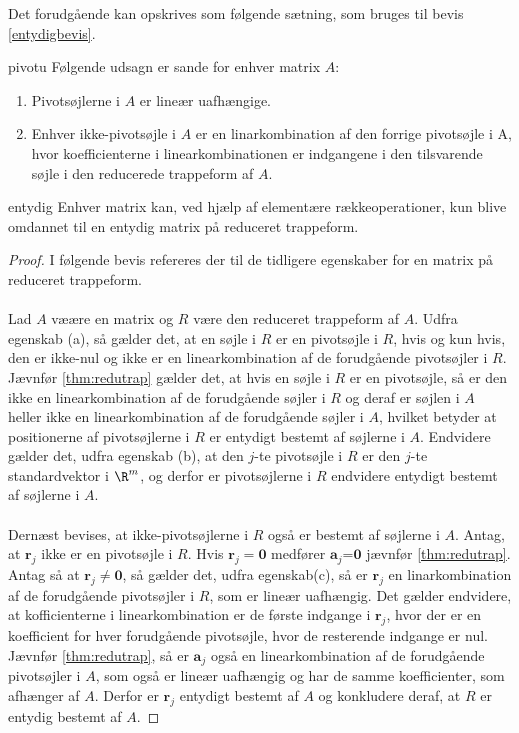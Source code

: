 %
Det forudgående kan opskrives som følgende sætning, som bruges til bevis \ref{entydigbevis}.
%
\begin{thm}{}{pivotu}
Følgende udsagn er sande for enhver matrix $A$: 
\begin{enumerate}[label=(\alph*)]
\item Pivotsøjlerne i $A$ er lineær uafhængige. 
\item Enhver ikke-pivotsøjle i $A$ er en linarkombination af den forrige pivotsøjle i A, hvor koefficienterne i linearkombinationen er indgangene i den tilsvarende søjle i den reducerede trappeform af $A$. 
\end{enumerate} 
\end{thm}
%
\begin{thm}{}{entydig}
Enhver matrix kan, ved hjælp af elementære rækkeoperationer, kun blive omdannet til en entydig matrix på reduceret trappeform.
\end{thm}
%
\begin{proof}
\label{entydigbevis}
I følgende bevis refereres der til de tidligere egenskaber for en matrix på reduceret trappeform. \\\\
Lad $A$ væære en matrix og $R$ være den reduceret trappeform af $A$. 
Udfra egenskab (a), så gælder det, at en søjle i $R$ er en pivotsøjle i $R$, hvis og kun hvis, den er ikke-nul og ikke er en linearkombination af de forudgående pivotsøjler i $R$. 
Jævnfør \ref{thm:redutrap} gælder det, at hvis en søjle i $R$ er en pivotsøjle, så er den ikke en linearkombination af de forudgående søjler i $R$ og deraf er søjlen i $A$ heller ikke en linearkombination af de forudgående  søjler i $A$, hvilket betyder at positionerne af pivotsøjlerne i $R$ er entydigt bestemt af søjlerne i $A$. 
Endvidere gælder det, udfra egenskab (b), at den $j$-te pivotsøjle i $R$ er den $j$-te standardvektor i $\R^m$, og derfor er pivotsøjlerne i $R$ endvidere entydigt bestemt af søjlerne i $A$. \\\\
Dernæst bevises, at ikke-pivotsøjlerne i $R$ også er bestemt af søjlerne i $A$. 
Antag, at $\textbf{r}_j$ ikke er en pivotsøjle i $R$.
Hvis $\textbf{r}_j=\textbf{0}$ medfører $\textbf{a}_j$=$\textbf{0}$ jævnfør \ref{thm:redutrap}. 
Antag så at $\textbf{r}_j \neq \textbf{0}$, så gælder det, udfra egenskab(c), så er $\textbf{r}_j$ en linarkombination af de forudgående pivotsøjler i $R$, som er lineær uafhængig. 
Det gælder endvidere, at kofficienterne i linearkombination er de første indgange i $\textbf{r}_j$, hvor der er en koefficient for hver forudgående pivotsøjle, hvor de resterende indgange er nul. 
Jævnfør \ref{thm:redutrap}, så er $\textbf{a}_j$ også en linearkombination af de forudgående pivotsøjler i $A$, som også er lineær uafhængig og har de samme koefficienter, som afhænger af $A$. 
Derfor er $\textbf{r}_j$ entydigt bestemt af $A$ og konkludere deraf, at $R$ er entydig bestemt af $A$. 
\end{proof}
